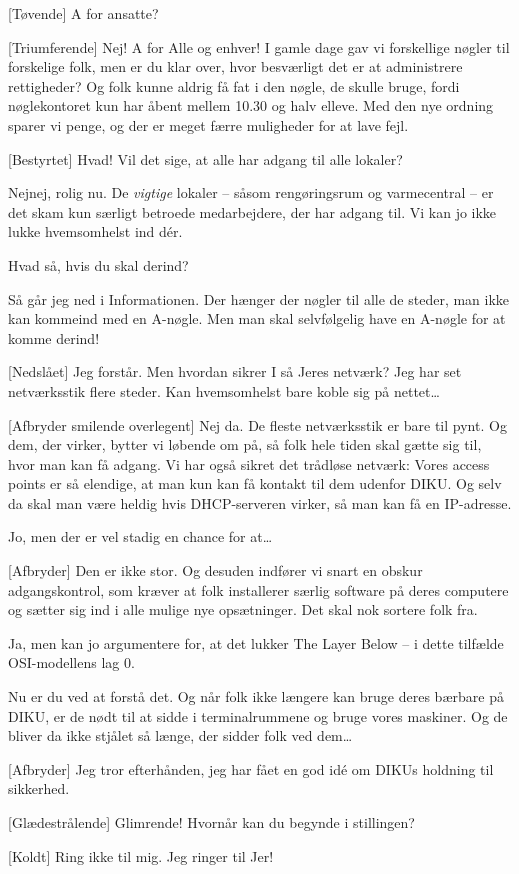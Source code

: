 \documentclass[a4paper,11pt]{article}
\begin{document}
\begin{sketch}
[Tøvende] A for ansatte?

[Triumferende] Nej! A for Alle og enhver! I gamle dage gav vi
forskellige nøgler til forskelige folk, men er du klar over, hvor besværligt
det er at administrere rettigheder? Og folk kunne aldrig få fat i den nøgle,
de skulle bruge, fordi nøglekontoret kun har åbent mellem 10.30 og halv
elleve. Med den nye ordning sparer vi penge, og der er
meget færre muligheder for at lave fejl.

[Bestyrtet] Hvad! Vil det sige, at alle har adgang til alle lokaler?

Nejnej, rolig nu. De \emph{vigtige} lokaler -- såsom rengøringsrum og
varmecentral -- er det skam kun særligt betroede medarbejdere, der har adgang
til. Vi kan jo ikke lukke hvemsomhelst ind dér.

 Hvad så, hvis du skal derind?

 Så går jeg ned i Informationen. Der hænger der nøgler til alle de
steder, man ikke kan kommeind med en A-nøgle. Men man skal selvfølgelig have en
A-nøgle for at komme derind!


[Nedslået] Jeg forstår. Men hvordan sikrer I så Jeres netværk? Jeg
har set netværksstik flere steder. Kan hvemsomhelst bare koble sig på nettet\ldots

[Afbryder smilende overlegent] Nej da. De fleste netværksstik er bare til
pynt. Og dem, der virker, bytter vi løbende om på, så folk hele tiden skal
gætte sig til, hvor man kan få adgang. Vi har også sikret det trådløse
netværk: Vores access points er så elendige, at man kun kan få kontakt til dem
udenfor DIKU. Og selv da skal man være heldig hvis DHCP-serveren virker, så
man kan få en IP-adresse.

 Jo, men der er vel stadig en chance for at\ldots

[Afbryder] Den er ikke stor. Og desuden indfører vi snart en obskur
adgangskontrol, som kræver at folk installerer særlig software på deres
computere og sætter sig ind i alle mulige nye opsætninger. Det skal nok
sortere folk fra. 

 Ja, men kan jo argumentere for, at det lukker The Layer Below -- i
dette tilfælde OSI-modellens lag 0.

 Nu er du ved at forstå det. Og når folk ikke længere kan bruge deres
bærbare på DIKU, er de nødt til at sidde i terminalrummene og bruge vores
maskiner. Og de bliver da ikke stjålet så længe, der sidder folk ved dem\ldots

[Afbryder] Jeg tror efterhånden, jeg har fået en god idé om DIKUs
holdning til sikkerhed.

[Glædestrålende] Glimrende! Hvornår kan du begynde i stillingen?

[Koldt] Ring ikke til mig. Jeg ringer til Jer!



\end{sketch}
\end{document}
